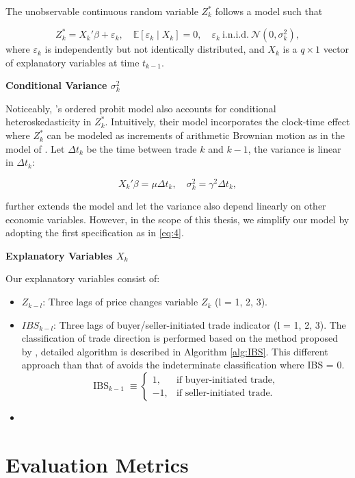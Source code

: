 The unobservable continuous random variable $Z^*_k$ follows a model such that

\begin{equation}
Z_k^* = X_k' \beta + \varepsilon_k, \quad \mathbb{E}[\varepsilon_k \mid X_k] = 0, \quad \varepsilon_k \ \text{i.n.i.d.} \ \mathcal{N}(0, \sigma_k^2),
    \label{eq:3}
\end{equation}
where \(\varepsilon_k\) is independently but not identically distributed, and $X_k$ is a \(q\times1\) vector of explanatory variables at time $t_{k-1}$.

{\noindent\bfseries Conditional Variance \(\sigma_k^2\)}

Noticeably, \citet{hausman1992}'s ordered probit model also accounts for conditional heteroskedasticity in $Z^*_k$. Intuitively, their model incorporates the clock-time effect where $Z^*_k$ can be modeled as increments of arithmetic Brownian motion as in the model of \citet{chofrees1988}. Let \(\Delta t_k\) be the time between trade $k$ and $k-1$, the variance is linear in \(\Delta t_k\):

\begin{equation}
X_k' \beta = \mu \Delta t_k, \quad \sigma_k^2 = \gamma^2 \Delta t_k,
    \label{eq:4}
\end{equation}

\citet{hausman1992} further extends the model and let the variance also depend linearly on other economic variables.
However, in the scope of this thesis, we simplify our model by adopting the first specification as in \eqref{eq:4}.

{\noindent\bfseries Explanatory Variables $X_k$ }

Our explanatory variables consist of:
\begin{itemize}
    \item $Z_{k-l}$: Three lags of price changes variable $Z_k$ (l = 1, 2, 3).
    \item $IBS_{k-l}$: Three lags of buyer/seller-initiated trade indicator (l = 1, 2, 3). The classification of trade direction is performed based on the method proposed by \citet{leeready1991}, detailed algorithm is described in Algorithm \ref{alg:IBS}. This different approach than that of \citet{hausman1992} avoids the indeterminate classification where IBS = 0.
    \begin{equation}
\mathrm{IBS}_{k-1} \;\equiv
\begin{cases}
1,  & \text{if buyer-initiated trade},\\
-1, & \text{if seller-initiated trade}.
\end{cases}
\label{eq:5}
\end{equation}
    
       \item 

    
\end{itemize}
















\section{Evaluation Metrics}